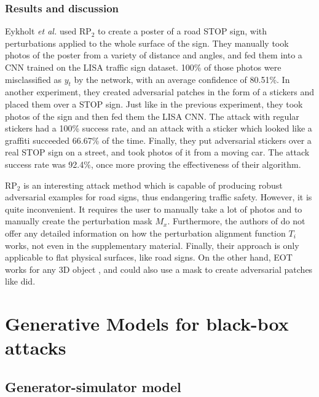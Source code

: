 \subsubsection{Results and discussion}
    \label{subsubsec:rp2_results}

Eykholt \textit{et al.} used $\textrm{RP}_2$ to create a poster of a road STOP sign, with perturbations applied to the whole surface of the sign. They manually took photos of the poster from a variety of distance and angles, and fed them into a CNN trained on the LISA traffic sign dataset. 100\% of those photos were misclassified as $y_t$ by the network, with an average confidence of 80.51\%. In another experiment, they created adversarial patches in the form of a stickers and placed them over a STOP sign. Just like in the previous experiment, they took photos of the sign and then fed them the LISA CNN. The attack with regular stickers had a 100\% success rate, and an attack with a sticker which looked like a graffiti succeeded 66.67\% of the time. Finally, they put adversarial stickers over a real STOP sign on a street, and took photos of it from a moving car. The attack success rate was 92.4\%, once more proving the effectiveness of their algorithm.

$\textrm{RP}_2$ is an interesting attack method which is capable of producing robust adversarial examples for road signs, thus endangering traffic safety. However, it is quite inconvenient. It requires the user to manually take a lot of photos and to manually create the perturbation mask $M_x$. Furthermore, the authors of \cite{evtimov_road_signs} do not offer any detailed information on how the perturbation alignment function $T_i$ works, not even in the supplementary material. Finally, their approach is only applicable to flat physical surfaces, like road signs. On the other hand, EOT works for any 3D object \cite{athalye}, and could also use a mask to create adversarial patches like \cite{evtimov_road_signs} did.

\section{Generative Models for black-box attacks}
    \label{sec:generative_models}
    
\subsection{Generator-simulator model}
    \label{subsubsec:zheng}

